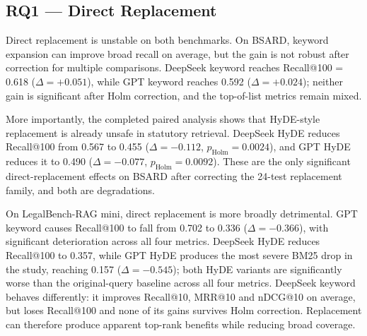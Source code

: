 \documentclass[a4paper,fleqn]{cas-dc}
\begin{document}
\subsection{RQ1 — Direct Replacement}
\label{sec:results-rq1}

Direct replacement is unstable on both benchmarks. On BSARD,
keyword expansion can improve broad recall on average, but the
gain is not robust after correction for multiple comparisons.
DeepSeek keyword reaches Recall@100 = 0.618
($\Delta=+0.051$), while GPT keyword reaches 0.592
($\Delta=+0.024$); neither gain is significant after Holm
correction, and the top-of-list metrics remain mixed.

More importantly, the completed paired analysis shows that
HyDE-style replacement is already unsafe in statutory retrieval.
DeepSeek HyDE reduces Recall@100 from 0.567 to 0.455
($\Delta=-0.112$, $p_{\mathrm{Holm}}=0.0024$), and GPT HyDE
reduces it to 0.490
($\Delta=-0.077$, $p_{\mathrm{Holm}}=0.0092$).
These are the only significant direct-replacement effects on
BSARD after correcting the 24-test replacement family, and both
are degradations.

On LegalBench-RAG mini, direct replacement is more broadly
detrimental. GPT keyword causes Recall@100 to fall from 0.702
to 0.336 ($\Delta=-0.366$), with significant deterioration
across all four metrics. DeepSeek HyDE reduces Recall@100 to
0.357, while GPT HyDE produces the most severe BM25 drop in the
study, reaching 0.157 ($\Delta=-0.545$); both HyDE variants are
significantly worse than the original-query baseline across all
four metrics. DeepSeek keyword behaves differently: it improves
Recall@10, MRR@10 and nDCG@10 on average, but loses Recall@100
and none of its gains survives Holm correction. Replacement can
therefore produce apparent top-rank benefits while reducing broad
coverage.
\end{document}
